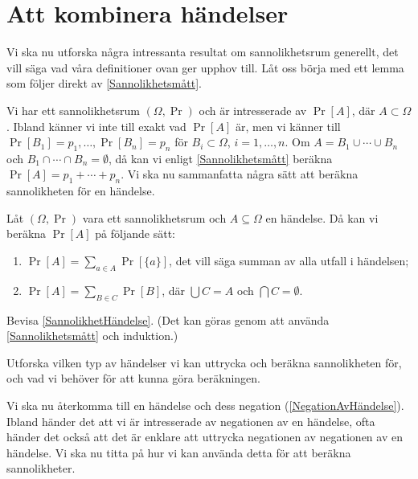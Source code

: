 \section{Att kombinera händelser}

Vi ska nu utforska några intressanta resultat om sannolikhetsrum generellt, det 
vill säga vad våra definitioner ovan ger upphov till.
Låt oss börja med ett lemma som följer direkt av \cref{Sannolikhetsmått}.

Vi har ett sannolikhetsrum \((\Omega, \Pr)\) och är intresserade av \(\Pr[A]\), 
där \(A\subset \Omega\).
Ibland känner vi inte till exakt vad \(\Pr[A]\) är, men vi känner till 
\(\Pr[B_1] = p_1, \dotsc, \Pr[B_n] = p_n\) för \(B_i\subset \Omega\), \(i = 1, 
  \dotsc, n\).
Om \(A = B_1\cup \dotsb\cup B_n\) och \(B_1\cap \dotsb\cap B_n = \emptyset\), 
då kan vi enligt \cref{Sannolikhetsmått} beräkna \(\Pr[A] = p_1 + \dotsb 
  + p_n\).
Vi ska nu sammanfatta några sätt att beräkna sannolikheten för en händelse.

\begin{lemma}\label{SannolikhetHändelse}
  Låt \((\Omega, \Pr)\) vara ett sannolikhetsrum och \(A\subseteq \Omega\) en 
  händelse.
  Då kan vi beräkna \(\Pr[A]\) på följande sätt:
  \begin{enumerate}
    \item \(\Pr[A] = \sum_{a\in A} \Pr[\{a\}]\), det vill säga summan av alla 
      utfall i händelsen;
    \item \(\Pr[A] = \sum_{B\in C} \Pr[B]\), där \(\bigcup C = A\) och 
      \(\bigcap C = \emptyset\).
  \end{enumerate}
\end{lemma}

\begin{exercise}
  Bevisa \cref{SannolikhetHändelse}.
  (Det kan göras genom att använda \cref{Sannolikhetsmått} och induktion.)
\end{exercise}

\begin{exercise}
  Utforska vilken typ av händelser vi kan uttrycka och beräkna sannolikheten 
  för, och vad vi behöver för att kunna göra beräkningen.
\end{exercise}

Vi ska nu återkomma till en händelse och dess negation 
(\cref{NegationAvHändelse}).
Ibland händer det att vi är intresserade av negationen av en händelse, ofta 
händer det också att det är enklare att uttrycka negationen av negationen av en
händelse.
Vi ska nu titta på hur vi kan använda detta för att beräkna sannolikheter.

